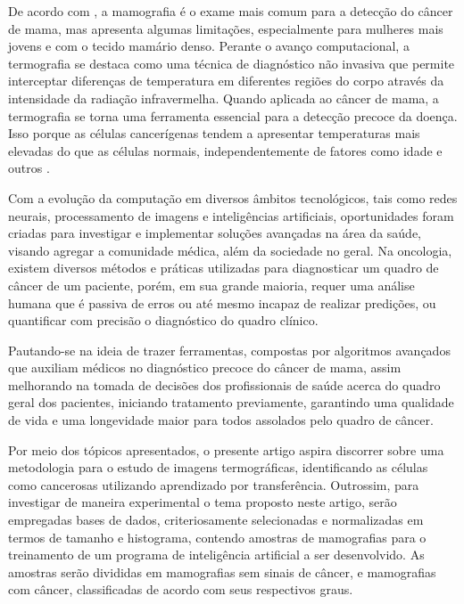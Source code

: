 De acordo com , a mamografia é o exame mais comum para a detecção do câncer de mama, mas apresenta algumas limitações, especialmente para mulheres mais jovens e com o tecido mamário denso. Perante o avanço computacional, a termografia se destaca como uma técnica de diagnóstico não invasiva que permite interceptar diferenças de temperatura em diferentes regiões do corpo através da intensidade da radiação infravermelha. Quando aplicada ao câncer de mama, a termografia se torna uma ferramenta essencial para a detecção precoce da doença. Isso porque as células cancerígenas tendem a apresentar temperaturas mais elevadas do que as células normais, independentemente de fatores como idade e outros \cite{leles}.

Com a evolução da computação em diversos âmbitos tecnológicos, tais como redes neurais, processamento de imagens e inteligências artificiais, oportunidades foram criadas para investigar e implementar soluções avançadas na área da saúde, visando agregar a comunidade médica, além da sociedade no geral. Na oncologia, existem diversos métodos e práticas utilizadas para diagnosticar um quadro de câncer de um paciente, porém, em sua grande maioria, requer uma análise humana que é passiva de erros ou até mesmo incapaz de realizar predições, ou quantificar com precisão o diagnóstico do quadro clínico.

Pautando-se na ideia de trazer ferramentas, compostas por algoritmos avançados que auxiliam médicos no diagnóstico precoce do câncer de mama, assim melhorando na tomada de decisões dos profissionais de saúde acerca do quadro geral dos pacientes, iniciando tratamento previamente, garantindo uma qualidade de vida e uma longevidade maior para todos assolados pelo quadro de câncer.

Por meio dos tópicos apresentados, o presente artigo aspira discorrer sobre uma metodologia para o estudo de imagens termográficas, identificando as células como cancerosas utilizando aprendizado por transferência. Outrossim, para investigar de maneira experimental o tema proposto neste artigo, serão empregadas bases de dados, criteriosamente selecionadas e normalizadas em termos de tamanho e histograma, contendo amostras de mamografias para o treinamento de um programa de inteligência artificial a ser desenvolvido. As amostras serão divididas em mamografias sem sinais de câncer, e mamografias com câncer, classificadas de acordo com seus respectivos graus.

